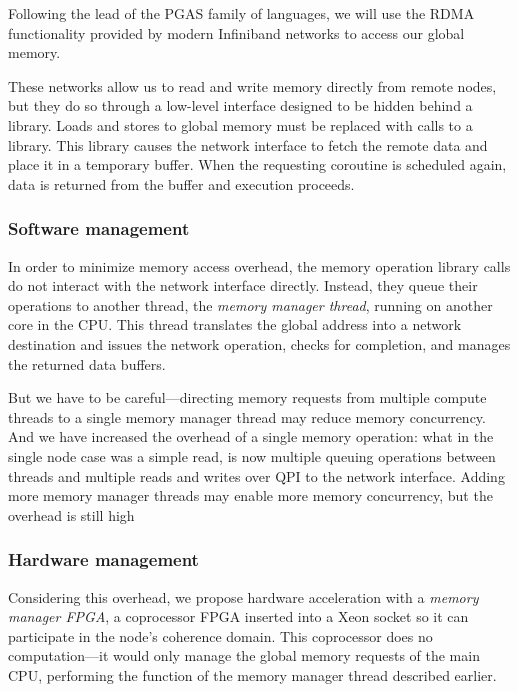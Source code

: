 \documentclass{acm_proc_article-sp}
\begin{document}



Following the lead of the PGAS family of languages, we will use
the RDMA functionality provided by modern Infiniband networks to
access our global memory. 

These networks allow us to read and write memory directly from remote
nodes, but they do so through a low-level interface designed to be
hidden behind a library. Loads and stores to global memory must be
replaced with calls to a library. This library causes the network
interface to fetch the remote data and place it in a temporary
buffer. When the requesting coroutine is scheduled again, data is
returned from the buffer and execution proceeds.

\subsubsection{Software management}
In order to minimize memory access overhead, the memory operation
library calls do not interact with the network interface
directly. Instead, they queue their operations to another thread, the
{\em memory manager thread}, running on another core in the CPU. This thread
translates the global address into a network destination and issues
the network operation, checks for completion, and manages the returned
data buffers.

But we have to be careful---directing memory requests from multiple
compute threads to a single memory manager thread may reduce memory
concurrency. And we have increased the overhead of a single memory
operation: what in the single node case was a simple read, is now
multiple queuing operations between threads and multiple reads and
writes over QPI to the network interface. Adding more memory manager
threads may enable more memory concurrency, but the overhead is still high 

\subsubsection{Hardware management}
Considering this overhead, we propose hardware acceleration with a {\em memory manager
  FPGA}, a coprocessor FPGA inserted into a Xeon socket so it can
participate in the node's coherence domain. This coprocessor does no
computation---it would only manage the global memory requests of the
main CPU, performing the function of the memory manager thread
described earlier.
\end{document}
